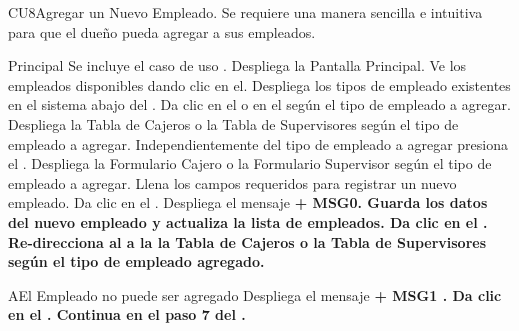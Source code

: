 \begin{UseCase}{CU8}{Agregar un Nuevo Empleado.}{
		Se requiere una manera sencilla e intuitiva para que el dueño pueda agregar a sus empleados.
	}
	\end{UseCase}
	\begin{UCtrayectoria}{Principal}
		\UCpaso Se incluye el caso de uso .
		\UCpaso Despliega la  {Pantalla Principal}.
		\UCpaso[\UCactor] Ve los empleados disponibles dando clic en el.
		\UCpaso Despliega los tipos de empleado existentes en el sistema abajo del .
		\UCpaso[\UCactor] Da clic en el  o en el  según el tipo de empleado a agregar.
		\UCpaso Despliega la  {Tabla de Cajeros} o la  {Tabla de Supervisores} según el tipo de empleado a agregar.
		\UCpaso[\UCactor] Independientemente del tipo de empleado a agregar presiona el .
		\UCpaso Despliega la  {Formulario Cajero} o la  {Formulario Supervisor} según el tipo de empleado a agregar.
		\UCpaso [\UCactor] Llena los campos requeridos para registrar un nuevo empleado. 
		\UCpaso[\UCactor] Da clic en el  .
		\UCpaso Despliega el mensaje \bf {+ MSG0}. 
		\UCpaso Guarda los datos del nuevo empleado y actualiza la lista de empleados.
		\UCpaso[\UCactor] Da clic en el .
		\UCpaso Re-direcciona al \UCactor a la la  {Tabla de Cajeros} o la  {Tabla de Supervisores} según el tipo de empleado agregado.
	\end{UCtrayectoria}


		\begin{UCtrayectoriaA}{A}{El Empleado no puede ser agregado}
			\UCpaso Despliega el mensaje \bf {+ MSG1 }.
			\UCpaso[\UCactor] Da clic en el .
			\UCpaso Continua en el paso 7 del .
		\end{UCtrayectoriaA}

